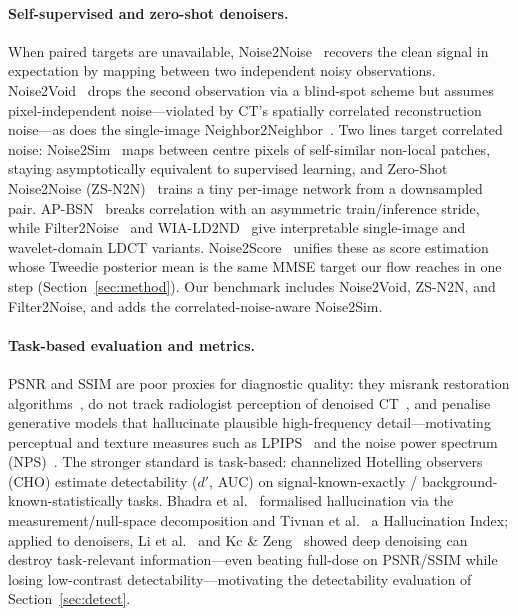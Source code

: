 \documentclass[letterpaper]{article} %
\begin{document}
\paragraph{Self-supervised and zero-shot denoisers.}
When paired targets are unavailable, Noise2Noise~\cite{lehtinen2018noise2noise}
recovers the clean signal in expectation by mapping between two independent noisy
observations.  Noise2Void~\cite{krull2019noise2void} drops the second observation
via a blind-spot scheme but assumes pixel-independent noise---violated by
CT's spatially correlated reconstruction noise---as does the single-image
Neighbor2Neighbor~\cite{huang2021neighbor2neighbor}.  Two lines target correlated
noise: Noise2Sim~\cite{niu2020noise2sim} maps between centre pixels of
self-similar non-local patches, staying asymptotically equivalent to supervised
learning, and Zero-Shot Noise2Noise (ZS-N2N)~\cite{mansour2023zsn2n} trains a tiny
per-image network from a downsampled pair.  AP-BSN~\cite{lee2022apbsn} breaks
correlation with an asymmetric train/inference stride, while
Filter2Noise~\cite{sun2025filter2noise} and WIA-LD2ND~\cite{zhao2024wia} give
interpretable single-image and wavelet-domain LDCT variants.
Noise2Score~\cite{kim2021noise2score} unifies these as score estimation whose
Tweedie posterior mean is the same MMSE target our flow reaches in one step
(Section~\ref{sec:method}).  Our benchmark includes Noise2Void, ZS-N2N, and
Filter2Noise, and adds the correlated-noise-aware Noise2Sim.

\paragraph{Task-based evaluation and metrics.}
\label{sec:rw-taskbased}
PSNR and SSIM are poor proxies for diagnostic quality: they misrank restoration
algorithms~\cite{breger2025reassess}, do not track radiologist perception of
denoised CT~\cite{lee2025ldctiqa}, and penalise generative models that
hallucinate plausible high-frequency detail---motivating perceptual and texture
measures such as LPIPS~\cite{zhang2018unreasonable} and the noise power spectrum
(NPS)~\cite{solomon2012characterization}.  The stronger standard is
task-based: channelized Hotelling observers (CHO) estimate detectability
($d'$, AUC) on signal-known-exactly / background-known-statistically tasks.
Bhadra et al.~\cite{bhadra2021halluc} formalised hallucination via the
measurement/null-space decomposition and Tivnan et al.~\cite{tivnan2024halluc} a
Hallucination Index; applied to denoisers, Li et al.~\cite{li2021detection} and
Kc \& Zeng~\cite{kc2024lgcho} showed deep denoising can destroy
task-relevant information---even beating full-dose on PSNR/SSIM while losing
low-contrast detectability---motivating the detectability evaluation of
Section~\ref{sec:detect}.
\end{document}
